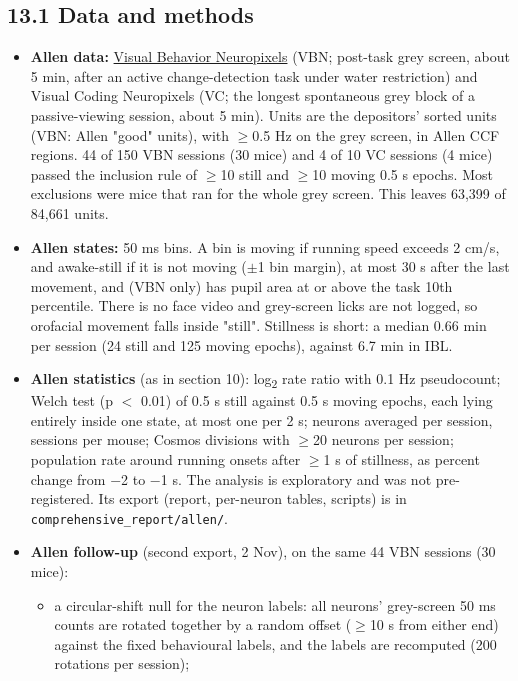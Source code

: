 \documentclass[10pt,a4paper]{article}
\begin{document}
\subsection{13.1 Data and methods}
\begin{itemize}
\item \textbf{Allen data:} \href{https://dandiarchive.org/dandiset/000713}{Visual Behavior Neuropixels} (VBN; post-task grey screen, about 5 min, after an active change-detection task under water restriction) and Visual Coding Neuropixels (VC; the longest spontaneous grey block of a passive-viewing session, about 5 min). Units are the depositors' sorted units (VBN: Allen "good" units), with $\geq$0.5 Hz on the grey screen, in Allen CCF regions. 44 of 150 VBN sessions (30 mice) and 4 of 10 VC sessions (4 mice) passed the inclusion rule of $\geq$10 still and $\geq$10 moving 0.5 s epochs. Most exclusions were mice that ran for the whole grey screen. This leaves 63,399 of 84,661 units.
\item \textbf{Allen states:} 50 ms bins. A bin is moving if running speed exceeds 2 cm/s, and awake-still if it is not moving ($\pm$1 bin margin), at most 30 s after the last movement, and (VBN only) has pupil area at or above the task 10th percentile. There is no face video and grey-screen licks are not logged, so orofacial movement falls inside "still". Stillness is short: a median 0.66 min per session (24 still and 125 moving epochs), against 6.7 min in IBL.
\item \textbf{Allen statistics} (as in section 10): log\textsubscript{2} rate ratio with 0.1 Hz pseudocount; Welch test (p $<$ 0.01) of 0.5 s still against 0.5 s moving epochs, each lying entirely inside one state, at most one per 2 s; neurons averaged per session, sessions per mouse; Cosmos divisions with $\geq$20 neurons per session; population rate around running onsets after $\geq$1 s of stillness, as percent change from $-$2 to $-$1 s. The analysis is exploratory and was not pre-registered. Its export (report, per-neuron tables, scripts) is in \texttt{comprehensive\_\allowbreak{}report/\allowbreak{}allen/\allowbreak{}}.
\item \textbf{Allen follow-up} (second export, 2 Nov), on the same 44 VBN sessions (30 mice): 
\begin{itemize}
\item a circular-shift null for the neuron labels: all neurons' grey-screen 50 ms counts are rotated together by a random offset ($\geq$10 s from either end) against the fixed behavioural labels, and the labels are recomputed (200 rotations per session);

\end{itemize}
\end{itemize}
\end{document}
